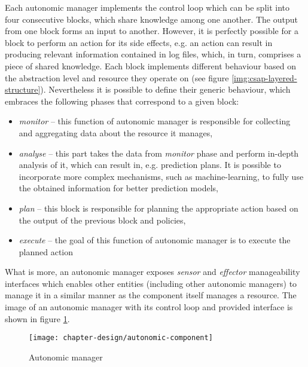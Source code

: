 Each autonomic manager implements the control loop which can be split into four consecutive blocks, which share knowledge among one another. The output from one block forms an input to another. However, it is perfectly possible for a block to perform an action for its side effects, e.g. an action can result in producing relevant information contained in log files, which, in turn, comprises a piece of shared knowledge. Each block implements different behaviour based on the abstraction level and resource they operate on (see figure \ref{img:csap-layered-structure}). Nevertheless it is possible to define their generic behaviour, which embraces the following phases that correspond to a given block:
\begin{itemize}
  \item \emph{monitor} -- this function of autonomic manager is responsible for collecting and aggregating data about the resource it manages,
  \item \emph{analyse} -- this part takes the data from \emph{monitor} phase and perform in-depth analysis of it, which can result in, e.g. prediction plans. It is possible to incorporate more complex mechanisms, such as machine-learning, to fully use the obtained information for better prediction models,
  \item \emph{plan} -- this block is responsible for planning the appropriate action based on the output of the previous block and policies,
  \item \emph{execute} -- the goal of this function of autonomic manager is to execute the planned action
\end{itemize}
What is more, an autonomic manager exposes \emph{sensor} and \emph{effector} manageability interfaces which enables other entities (including other autonomic managers) to manage it in a similar manner as the component itself manages a resource. The image of an autonomic manager with its control loop and provided interface is shown in figure \ref{img:autonomic-component}.




\begin{figure}[!ht]
  \begin{center}
    \texttt{[image: chapter-design/autonomic-component]}
  \end{center}
  \caption{Autonomic manager}
  \label{img:autonomic-component}
\end{figure}


